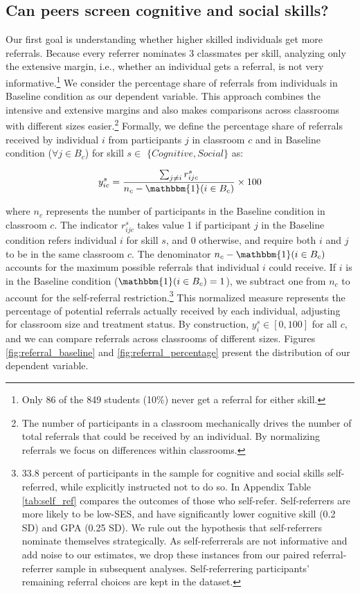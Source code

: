 \documentclass[11pt,a4paper,oneside]{article}
\begin{document}
\subsection*{Can peers screen cognitive and social skills?}
Our first goal is understanding whether higher skilled individuals get more referrals. Because every referrer nominates 3 classmates per skill, analyzing only the extensive margin, i.e., whether an individual gets a referral, is not very informative.\footnote{Only 86 of the 849 students (10\%) never get a referral for either skill.} We consider the percentage share of referrals from individuals in Baseline condition as our dependent variable. This approach combines the intensive and extensive margins and also makes comparisons across classrooms with different sizes easier.\footnote{The number of participants in a classroom mechanically drives the number of total referrals that could be received by an individual. By normalizing referrals we focus on differences within classrooms.} Formally, we define the percentage share of  referrals received by individual $i$ from participants $j$ in classroom $c$ and in Baseline condition ($\forall j \in B_c$) for skill $s\in$ $\{Cognitive, Social\}$ as: 

\begin{equation}\label{ys_def}
    y_{ic}^s = \frac{\sum_{j \neq i} r_{ijc}^s}{n_{c} - \mathbbm{1}(i \in B_c)} \times 100
    \end{equation}
  
where $n_c$ represents the number of participants in the Baseline condition in classroom $c$. The indicator $r_{ijc}^s$ takes value 1 if participant $j$ in the Baseline condition refers individual $i$ for skill $s$, and 0 otherwise, and require both $i$ and $j$ to be in the same classroom $c$. The denominator $n_{c} - \mathbbm{1}(i \in B_c)$ accounts for the maximum possible referrals that individual $i$ could receive. If $i$ is in the Baseline condition ($\mathbbm{1}(i \in B_c)=1$), we subtract one from $n_c$ to account for the self-referral restriction.\footnote{33.8 percent of participants in the sample for cognitive and social skills self-referred, while explicitly instructed not to do so. In Appendix Table \ref{tab:self_ref} compares the outcomes of those who self-refer. Self-referrers are more likely to be low-SES, and have significantly lower cognitive skill (0.2 SD) and GPA (0.25 SD). We rule out the hypothesis that self-referrers nominate themselves strategically. As self-referrerals are not informative and add noise to our estimates, we drop these instances from our paired referral-referrer sample in subsequent analyses. Self-referrering participants' remaining referral choices are kept in the dataset.}
This normalized measure represents the percentage of potential referrals actually received by each individual, adjusting for classroom size and treatment status. By construction, $y_{i}^s \in [0,100]$ for all $c$, and we can compare referrals across classrooms of different sizes. Figures \ref{fig:referral_baseline} and \ref{fig:referral_percentage} present the distribution of our dependent variable. 
\end{document}
